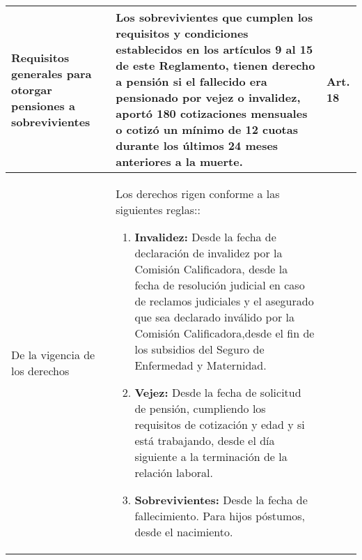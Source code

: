 \documentclass[
]{article}
\begin{document}
\begin{longtable}{|m{4cm}|m{10cm}|m{1.3cm}|}
Requisitos generales para otorgar pensiones a sobrevivientes & Los sobrevivientes que cumplen los requisitos y condiciones establecidos en los artículos 9 al 15 de este Reglamento, tienen derecho a pensión si el fallecido era pensionado por vejez o invalidez, aportó 180 cotizaciones mensuales o cotizó un mínimo de 12 cuotas durante los últimos 24 meses anteriores a la muerte.
 & Art. 18 \\
\hline
De la vigencia de los derechos & Los derechos rigen conforme a las siguientes reglas::
\begin{enumerate}
    \item \textbf{Invalidez:} Desde la fecha de declaración de invalidez por la Comisión Calificadora, desde la fecha de resolución judicial en caso de reclamos judiciales y el asegurado que sea declarado inválido por la Comisión Calificadora,desde el fin de los subsidios del Seguro de Enfermedad y Maternidad.
    \item \textbf{Vejez:} Desde la fecha de solicitud de pensión, cumpliendo los requisitos de cotización y edad y si está trabajando, desde el día siguiente a la terminación de la relación laboral.
    \item \textbf{Sobrevivientes:} Desde la fecha de fallecimiento. Para hijos póstumos, desde el nacimiento.


\end{enumerate}
\end{longtable}
\end{document}
